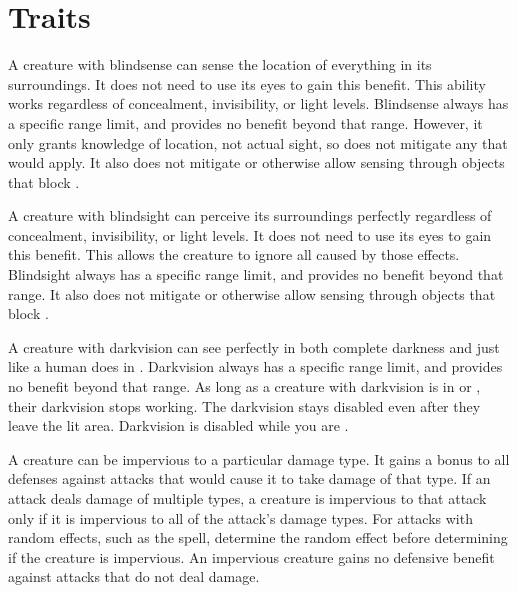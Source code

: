 \newpage
\section{Traits}\label{Traits}

        A creature with blindsense can sense the location of everything in its surroundings.
        It does not need to use its eyes to gain this benefit.
        This ability works regardless of concealment, invisibility, or light levels.
        Blindsense always has a specific range limit, and provides no benefit beyond that range.
        However, it only grants knowledge of location, not actual sight, so does not mitigate any  that would apply.
        It also does not mitigate  or otherwise allow sensing through objects that block .

        A creature with blindsight can perceive its surroundings perfectly regardless of concealment, invisibility, or light levels.
        It does not need to use its eyes to gain this benefit.
        This allows the creature to ignore all  caused by those effects.
        Blindsight always has a specific range limit, and provides no benefit beyond that range.
        It also does not mitigate  or otherwise allow sensing through objects that block .

        A creature with darkvision can see perfectly in both complete darkness and  just like a human does in .
        Darkvision always has a specific range limit, and provides no benefit beyond that range.
        As long as a creature with darkvision is in  or , their darkvision stops working.
        The darkvision  stays disabled even after they leave the lit area.
        Darkvision is disabled while you are \dazzled.

        A creature can be impervious to a particular damage type.
        It gains a  bonus to all defenses against attacks that would cause it to take damage of that type.
        If an attack deals damage of multiple types, a creature is impervious to that attack only if it is impervious to all of the attack's damage types.
        For attacks with random effects, such as the  spell, determine the random effect before determining if the creature is impervious.
        An impervious creature gains no defensive benefit against attacks that do not deal damage.

